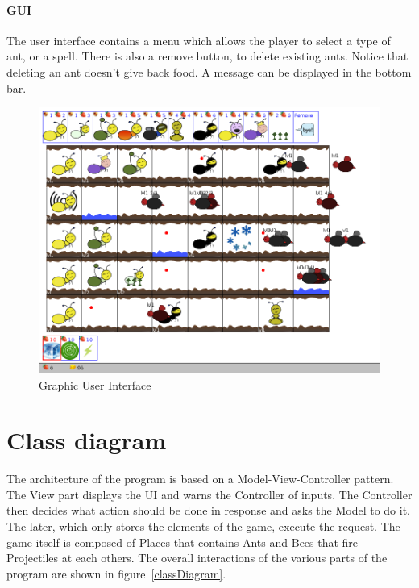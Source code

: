 \documentclass[a4paper]{article}
\begin{document}
\paragraph{GUI} The user interface contains a menu which allows the player to select a type of ant, or a spell. There is also a remove button, to delete existing ants. Notice that deleting an ant doesn't give back food. A message can be displayed in the bottom bar.

\begin{figure}[H]
	\center
	\includegraphics[scale=0.3]{screen2.png}
	\caption{Graphic User Interface}
	\label{gui}
\end{figure}


\section{Class diagram}

%

The architecture of the program is based on a Model-View-Controller pattern. The View part displays the UI and warns the Controller of inputs. The Controller then decides what action should be done in response and asks the Model to do it. The later, which only stores the elements of the game, execute the request.
The game itself is composed of Places that contains Ants and Bees that fire Projectiles at each others.
The overall interactions of the various parts of the program are shown in figure~\ref{classDiagram}.
\end{document}
